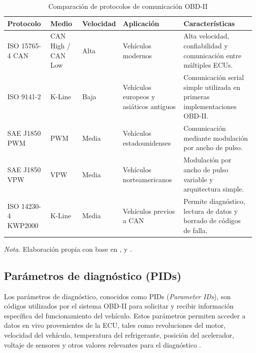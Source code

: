 \begin{table}[h]
	\centering
	\captionsetup{labelformat=simple, labelsep=newline, textfont=it, labelfont=bf}
	\caption{Comparación de protocolos de comunicación OBD-II}
	\label{tab:compation}
	\vspace{0.3cm}
	
	\begin{tabularx}{\linewidth}{p{3.5cm} p{2.2cm} p{1.6cm} p{2.8cm} X}
		\toprule 
		\rowcolor[rgb]{0.851, 0.851, 0.851}
		\textbf{Protocolo} & \textbf{Medio} & \textbf{Velocidad} & \textbf{Aplicación} & \textbf{Características} \\
		\midrule 
		ISO 15765-4 CAN & CAN High / CAN Low & Alta & Vehículos modernos & Alta velocidad, confiabilidad y comunicación entre múltiples ECUs. \\
		\addlinespace
		ISO 9141-2 & K-Line & Baja & Vehículos europeos y asiáticos antiguos & Comunicación serial simple utilizada en primeras implementaciones OBD-II. \\
		\addlinespace
		SAE J1850 PWM & PWM & Media & Vehículos estadounidenses & Comunicación mediante modulación por ancho de pulso. \\
		\addlinespace
		SAE J1850 VPW & VPW & Media & Vehículos norteamericanos & Modulación por ancho de pulso variable y arquitectura simple. \\
		\addlinespace
		ISO 14230-4 KWP2000 & K-Line & Media & Vehículos previos a CAN & Permite diagnóstico, lectura de datos y borrado de códigos de falla. \\
		\bottomrule 
	\end{tabularx}
	\vspace{0.2cm}
	
	\begin{flushleft}
		\footnotesize \textit{Nota.} Elaboración propia con base en \citep{Flexihub_OBD2}, \citep{Autosoporte_OBDII} y \citep{Autoavance_OBD2}.
	\end{flushleft}
\end{table}

\subsection{Parámetros de diagnóstico (PIDs)}

Los parámetros de diagnóstico, conocidos como PIDs (\textit{Parameter IDs}), son códigos utilizados por el sistema OBD-II para solicitar y recibir información específica del funcionamiento del vehículo. Estos parámetros permiten acceder a datos en vivo provenientes de la ECU, tales como revoluciones del motor, velocidad del vehículo, temperatura del refrigerante, posición del acelerador, voltaje de sensores y otros valores relevantes para el diagnóstico \citep{Wikibooks_PIDModo01, Geotab_OBDII}.

